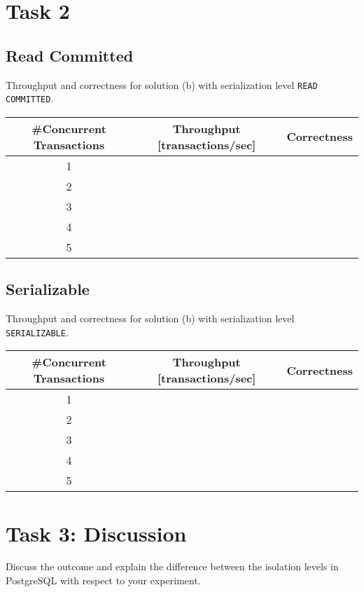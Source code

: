 \documentclass[11pt]{scrartcl}
\begin{document}
\medskip

\section*{Task 2}

\subsection*{Read Committed}

Throughput and correctness for solution (b) with serialization level
{\tt\small READ COMMITTED}.

\bigskip

\begin{tabular}{c|c|c}
  \#Concurrent Transactions & Throughput [transactions/sec] & Correctness
  \\\hline
  1 & & \\
  2 & & \\
  3 & & \\
  4 & & \\
  5 & & \\    
\end{tabular}

\medskip

\subsection*{Serializable}

Throughput and correctness for solution (b) with serialization level
{\tt\small SERIALIZABLE}.

\bigskip

\begin{tabular}{c|c|c}
  \#Concurrent Transactions & Throughput [transactions/sec] & Correctness
  \\\hline
  1 & & \\
  2 & & \\
  3 & & \\
  4 & & \\
  5 & & \\    
\end{tabular}

\medskip

\section*{Task 3: Discussion}

Discuss the outcome and explain the difference between the isolation
levels in PostgreSQL with respect to your experiment.
\end{document}
